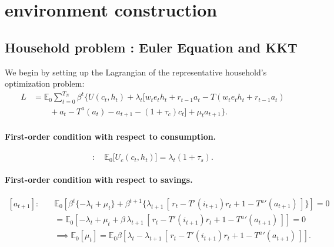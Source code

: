 \documentclass[11pt]{article}
\begin{document}
\section{environment construction}
\subsection{Household problem : Euler Equation and KKT}

We begin by setting up the Lagrangian of the representative household’s optimization problem:
\begin{equation}
\begin{aligned}
L &= \mathbb{E}_0 \sum_{t=0}^{T_N} \beta^t \Big\{ U(c_t,h_t) 
+ \lambda_t \big[ w_t e_t h_t + r_{t-1} a_t - T(w_t e_t h_t + r_{t-1} a_t) \\
&\qquad + a_t - T^a(a_t) - a_{t+1} - (1+\tau_c)c_t \big] 
+ \mu_t a_{t+1} \Big\}.
\end{aligned}
\end{equation}

\paragraph{First-order condition with respect to consumption.}
\begin{equation}
[c_t]: \quad \mathbb{E}_0 \big[ U_c(c_t,h_t) \big] 
= \lambda_t (1+\tau_s).
\end{equation}

\paragraph{First-order condition with respect to savings.}
\begin{equation}
\begin{aligned}
[a_{t+1}]:\quad &
\mathbb{E}_0 \!\left[ \beta^t \{-\lambda_t + \mu_t\} 
+ \beta^{t+1} \big\{ \lambda_{t+1}\,[\,r_t - T'(i_{t+1})r_t + 1 - {T^a}'(a_{t+1})\,] \big\} \right] = 0 \\
&= \mathbb{E}_0 \!\left[ -\lambda_t + \mu_t 
+ \beta \,\lambda_{t+1}\,[\,r_t - T'(i_{t+1})r_t + 1 - {T^a}'(a_{t+1})\,] \right] = 0 \\
&\implies \mathbb{E}_0[\mu_t] 
= \mathbb{E}_0 \beta \!\left[ \lambda_t 
- \lambda_{t+1}\,[\,r_t - T'(i_{t+1})r_t + 1 - {T^a}'(a_{t+1})\,] \right].
\end{aligned}
\end{equation}
\end{document}
